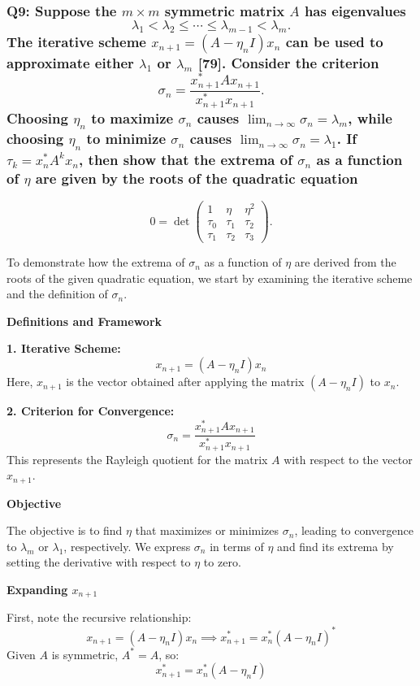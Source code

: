 \documentclass[8pt]{article}
\begin{document}
{\subsubsection*{Q9: Suppose the \(m \times m\) symmetric matrix \(A\) has eigenvalues
\[
\lambda_1 < \lambda_2 \le \cdots \le \lambda_{m-1} < \lambda_m.
\]
The iterative scheme \(x_{n+1} = (A - \eta_n I)x_n\) can be used to approximate either \(\lambda_1\) or \(\lambda_m\) [79]. Consider the criterion
\[
\sigma_n = \frac{x_{n+1}^* A x_{n+1}}{x_{n+1}^* x_{n+1}}.
\]
Choosing \(\eta_n\) to maximize \(\sigma_n\) causes \(\lim_{n \to \infty} \sigma_n = \lambda_m\), while choosing \(\eta_n\) to minimize \(\sigma_n\) causes \(\lim_{n \to \infty} \sigma_n = \lambda_1\). If \(\tau_k = x_n^* A^k x_n\), then show that the extrema of \(\sigma_n\) as a function of \(\eta\) are given by the roots of the quadratic equation}
\[
0 = \det \begin{pmatrix}
1 & \eta & \eta^2 \\
\tau_0 & \tau_1 & \tau_2 \\
\tau_1 & \tau_2 & \tau_3
\end{pmatrix}.
\]

To demonstrate how the extrema of \(\sigma_n\) as a function of \(\eta\) are derived from the roots of the given quadratic equation, we start by examining the iterative scheme and the definition of \(\sigma_n\).

\textbf{Definitions and Framework}

\textbf{1. Iterative Scheme:}
   \[
   x_{n+1} = (A - \eta_n I)x_n
   \]
   Here, \(x_{n+1}\) is the vector obtained after applying the matrix \((A - \eta_n I)\) to \(x_n\).

\textbf{2. Criterion for Convergence:}
   \[
   \sigma_n = \frac{x_{n+1}^* A x_{n+1}}{x_{n+1}^* x_{n+1}}
   \]
   This represents the Rayleigh quotient for the matrix \(A\) with respect to the vector \(x_{n+1}\).

\textbf{Objective}

The objective is to find \(\eta\) that maximizes or minimizes \(\sigma_n\), leading to convergence to \(\lambda_m\) or \(\lambda_1\), respectively. We express \(\sigma_n\) in terms of \(\eta\) and find its extrema by setting the derivative with respect to \(\eta\) to zero.

\textbf{Expanding \(x_{n+1}\)}

First, note the recursive relationship:
\[
x_{n+1} = (A - \eta_n I)x_n \implies x_{n+1}^* = x_n^* (A - \eta_n I)^*
\]
Given \(A\) is symmetric, \(A^* = A\), so:
\[
x_{n+1}^* = x_n^* (A - \eta_n I)
\]

}
\end{document}
